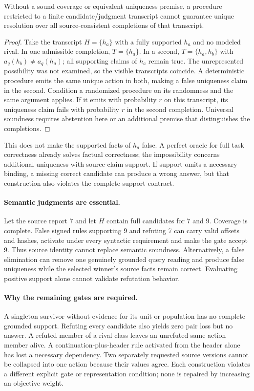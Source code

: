 \begin{proposition}
\label{prop:coverage-impossibility}
Without a sound coverage or equivalent uniqueness premise, a procedure
restricted to a finite candidate/judgment transcript cannot guarantee unique
resolution over all source-consistent completions of that transcript.
\end{proposition}
\begin{proof}
Take the transcript $H=\{h_a\}$ with a fully supported $h_a$ and no modeled
rival. In one admissible completion, $T=\{h_a\}$. In a second,
$T=\{h_a,h_b\}$ with $a_q(h_b)\ne a_q(h_a)$; all supporting claims of $h_a$
remain true. The unrepresented possibility was not examined, so the visible
transcripts coincide. A deterministic procedure emits the same unique action
in both, making a false uniqueness claim in the second. Condition a randomized
procedure on its randomness and the same argument applies. If it emits with
probability $r$ on this transcript, its uniqueness claim fails with probability
$r$ in the second completion. Universal soundness requires abstention here or
an additional premise that distinguishes the completions.
\end{proof}
This does not make the supported facts of $h_a$ false. A perfect oracle for
full task correctness already solves factual correctness; the impossibility
concerns additional uniqueness with source-claim support. If support omits a
necessary binding, a missing correct candidate can produce a wrong answer,
but that construction also violates the complete-support contract.

\paragraph{Semantic judgments are essential.}
Let the source report 7 and let $H$ contain full candidates for 7 and 9.
Coverage is complete. False signed rules supporting 9 and refuting 7 can carry
valid offsets and hashes, activate under every syntactic requirement and make
the gate accept 9. Thus source identity cannot replace semantic soundness.
Alternatively, a false elimination can remove one genuinely grounded query
reading and produce false uniqueness while the selected winner's source
facts remain correct. Evaluating positive support alone cannot validate
refutation behavior.

\paragraph{Why the remaining gates are required.}
A singleton survivor without evidence for its unit or population has no
complete grounded support. Refuting every candidate also yields zero pair
loss but no answer. A refuted member of a rival class leaves an unrefuted
same-action member alive. A continuation-plus-header rule activated from the
header alone has lost a necessary dependency. Two separately requested source
versions cannot be collapsed into one action because their values agree.
Each construction violates a different explicit gate or representation
condition; none is repaired by increasing an objective weight.

